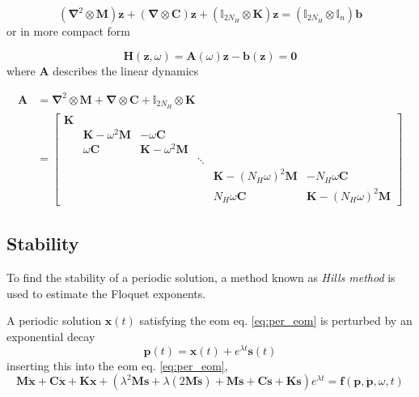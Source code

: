 \begin{equation}
  (\bm \nabla^2 \otimes \bm M)\bm z + (\bm \nabla \otimes \bm C)\bm z +
  (\mathbb{I}_{2N_H} \otimes \bm K)\bm z =
  (\mathbb{I}_{2N_H} \otimes \mathbb{I}_n )\bm b
\end{equation}
or in more compact form

\begin{equation}
  \label{eq:hb_feom_compact}
  \bm H(\bm z, \omega) = \bm A(\omega) \bm z - \bm b(\bm z) = \bm 0
\end{equation}
where $\bm A$ describes the linear dynamics

\begin{equation}
  \label{eq:hb_A}
  \begin{aligned}
    \bm A &= \bm \nabla^2 \otimes \bm M + \bm \nabla \otimes \bm C +
    \mathbb{I}_{2N_H} \otimes \bm K \\
    &=
    \begin{bmatrix}
      \bm K \\
      & \bm K - \omega^2 \bm M & -\omega \bm C \\
      & \omega \bm C & \bm K - \omega^2 \bm M \\
      & & & \ddots \\
      & & & & \bm K - (N_H \omega)^2 \bm M & -N_H \omega \bm C \\
      & & & & N_H \omega \bm C & \bm K - (N_H \omega)^2 \bm M
    \end{bmatrix}
  \end{aligned}
\end{equation}


\subsection{Stability}
\label{sec:hb_stab_appendix}

To find the stability of a periodic solution, a method known as \textit{Hills
  method} is used to estimate the Floquet exponents.

A periodic solution $\bm x(t)$ satisfying the eom eq. \eqref{eq:per_eom} is
perturbed by an exponential decay
\begin{equation}
  \label{eq:hb_pert}
  \bm p(t) = \bm x(t) + e^{\lambda t}\bm s(t)
\end{equation}
inserting this into the eom eq. \eqref{eq:per_eom},
\begin{equation}
  \bm M\ddot{\bm x} + \bm C\dot{\bm x} + \bm K\bm x +
  (\lambda^2 \bm M \bm s + \lambda(2\bm M \dot{\bm s}) +
  \bm M\ddot{\bm s} + \bm C\dot{\bm s} + \bm K \bm s ) e^{\lambda t} =
  \bm f(\bm p, \dot{\bm p}, \omega, t)
\end{equation}

